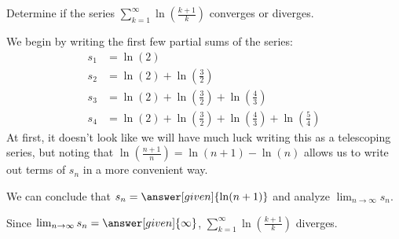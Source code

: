 \documentclass{ximera}
\begin{document}
\begin{example}
Determine if the series $\sum_{k=1}^\infty \ln\left(\frac{k+1}{k}\right)$ converges or diverges. 
 
\begin{explanation}
We begin by writing the first few partial sums of the series:
\begin{align*}
s_1 &= \ln\left(2\right) \\
s_2 &= \ln\left(2\right)+\ln\left(\frac32\right) \\
s_3 &= \ln\left(2\right)+\ln\left(\frac32\right)+\ln\left(\frac43\right) \\
s_4 &= \ln\left(2\right)+\ln\left(\frac32\right)+\ln\left(\frac43\right)+\ln\left(\frac54\right) 
\end{align*}
At first, it doesn't look like we will have much luck writing this as a telescoping series, but noting that $ \ln\left(\frac{n+1}{n}\right) = \ln(n+1)-\ln(n)$ allows us to write out terms of $s_n$ in a more convenient way.

  \begin{image}
  \end{image}
  
  


We can conclude that $s_n =\answer[given]{\ln (n+1)}$ and analyze $\lim_{n \to \infty} s_n$.  

Since $\lim_{n\to\infty}s_n=\answer[given]{\infty}$, $\sum_{k=1}^\infty \ln\left(\frac{k+1}{k}\right)$ diverges.
\end{explanation}
\end{example}
\end{document}
